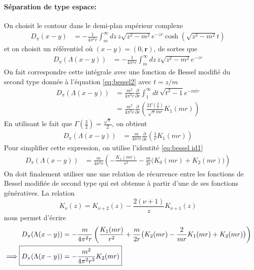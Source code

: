 \documentclass{article}
\numberwithin{equation}{section}
\begin{document}
\paragraph{Séparation de type espace:} On choisit le contour dans le demi-plan supérieur complexe
\begin{align*}
        D_{\pi}(x - y)
        &= -\frac{1}{4\pi^2r}
        \int_{m }^{\infty } dz\, z \sqrt{z^2 - m^2} e^{-zr}\cosh(\sqrt{z^2 - m^2}t)
\end{align*}
et on choisit un référentiel où $(x - y) = (0, \mathbf{r})$, de sortes que
\begin{align*}
        D_{\pi}(\Lambda(x - y))
        &= -\frac{1}{4\pi^2r}
        \int_{m }^{\infty } dz\, z \sqrt{z^2 - m^2} e^{-zr}
\end{align*}
On fait correspondre cette intégrale avec une fonction de Bessel modifié du second type donnée à l'équation \eqref{eq:bessel2}
avec $t = z / m$
\begin{align*}
        D_{\pi}(\Lambda(x - y)) &= \frac{m^2}{4\pi^2r}\frac{\partial }{\partial r} \int_{1 }^{\infty  } dt\,  \sqrt{t^2 - 1} e^{-mtr} \\
                &= \frac{m^2}{4\pi^2r}\frac{\partial }{\partial r} \left( \frac{2\Gamma(\frac{3}{2})}{\sqrt{\pi} mr} K_1(mr) \right)
\end{align*}
En utilisant le fait que $\Gamma(\frac{3}{2}) = \frac{\sqrt{\pi}}{2}$, on obtient
\begin{align*}
        D_{\pi}(\Lambda(x - y)) &= \frac{m}{4\pi^2r}\frac{\partial }{\partial r} \left( \frac{1}{r} K_1(mr) \right)
\end{align*}
Pour simplifier cette expression, on utilise l'identité \eqref{eq:bessel id1}
\begin{align*}
        D_{\pi}(\Lambda(x - y)) &= \frac{m}{4\pi^2r} \left( -\frac{K_1(mr)}{r^2} - \frac{m}{2r}\big(K_0(mr) + K_2(mr)\big) \right)
\end{align*}
On doit finalement utiliser une une relation de récurrence entre les fonctions de Bessel modifiée de second type qui 
est obtenue à partir d'une de ses fonctions génératives. La relation
\begin{equation}
        K_{\nu}(z) = K_{\nu + 2}(z) - \frac{2(\nu + 1)}{z}K_{\nu + 1}(z)
\end{equation} 
nous permet d'écrire
\begin{align}
        \nonumber
       D_{\pi}(\Lambda(x - y)) &=  -\frac{m}{4\pi^2r} \left( \frac{K_1(mr)}{r^2} + \frac{m}{2r}\big(K_2(mr) - \frac{2}{mr}K_1(mr) + K_2(mr)\big) \right)  \\
        \label{eq:spacelike}
        \implies \Aboxed{D_{\pi}(\Lambda(x - y))  &=  -\frac{m^2}{4\pi^2r^2} K_2(mr)}
\end{align}
\end{document}
